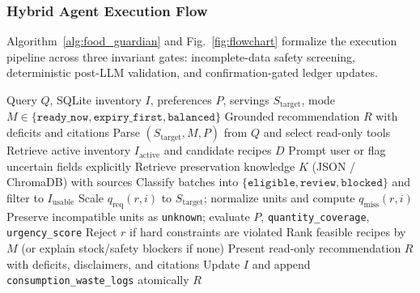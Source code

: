 \subsubsection{Hybrid Agent Execution Flow}
Algorithm~\ref{alg:food_guardian} and Fig.~\ref{fig:flowchart} formalize the execution pipeline across three invariant gates: incomplete-data safety screening, deterministic post-LLM validation, and confirmation-gated ledger updates.

\begin{algorithm}[t]
\caption{Food Guardian Hybrid AI Agent Execution}
\label{alg:food_guardian}
\begin{algorithmic}[1]
\REQUIRE Query $Q$, SQLite inventory $I$, preferences $P$, servings $S_{\text{target}}$, mode $M \in \{\texttt{ready\_now}, \texttt{expiry\_first}, \texttt{balanced}\}$
\ENSURE Grounded recommendation $R$ with deficits and citations
\STATE Parse $(S_{\text{target}}, M, P)$ from $Q$ and select read-only tools
\STATE Retrieve active inventory $I_{\text{active}}$ and candidate recipes $D$
    \STATE Prompt user or flag uncertain fields explicitly
\ENDIF
\STATE Retrieve preservation knowledge $K$ (JSON / ChromaDB) with sources
\STATE Classify batches into $\{\texttt{eligible}, \texttt{review}, \texttt{blocked}\}$ and filter to $I_{\text{usable}}$
    \STATE Scale $q_{\text{req}}(r, i)$ to $S_{\text{target}}$; normalize units and compute $q_{\text{miss}}(r, i)$
    \STATE Preserve incompatible units as \texttt{unknown}; evaluate $P$, \texttt{quantity\_\allowbreak coverage}, \texttt{urgency\_score}
    \STATE Reject $r$ if hard constraints are violated
\ENDFOR
\STATE Rank feasible recipes by $M$ (or explain stock/safety blockers if none)
\STATE Present read-only recommendation $R$ with deficits, disclaimers, and citations
    \STATE Update $I$ and append \texttt{consumption\_\allowbreak waste\_logs} atomically
\ENDIF
\RETURN $R$
\end{algorithmic}
\end{algorithm}

